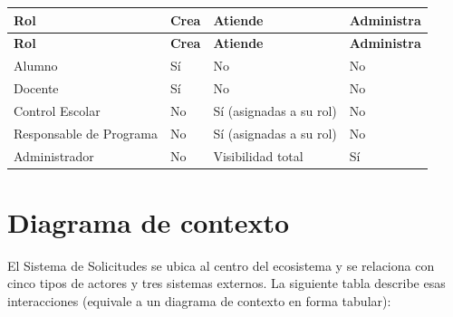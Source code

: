 \documentclass[12pt,letterpaper]{report}
\begin{document}
\begin{longtable}{|L{3.5cm}|C{2.6cm}|C{2.8cm}|C{2.6cm}|}
    \hline
    \textbf{Rol} & \textbf{Crea} & \textbf{Atiende} & \textbf{Administra} \\
    \hline
    \endfirsthead
    \hline
    \textbf{Rol} & \textbf{Crea} & \textbf{Atiende} & \textbf{Administra} \\
    \hline
    \endhead
    \hline
    \endfoot

    Alumno & Sí & No & No \\
    \hline
    Docente & Sí & No & No \\
    \hline
    Control Escolar & No & Sí (asignadas a su rol) & No \\
    \hline
    Responsable de Programa & No & Sí (asignadas a su rol) & No \\
    \hline
    Administrador & No & Visibilidad total & Sí \\
    \hline
\end{longtable}

\section{Diagrama de contexto}

El Sistema de Solicitudes se ubica al centro del ecosistema y se relaciona con cinco tipos de actores y tres sistemas externos. La siguiente tabla describe esas interacciones (equivale a un diagrama de contexto en forma tabular):
\end{document}
